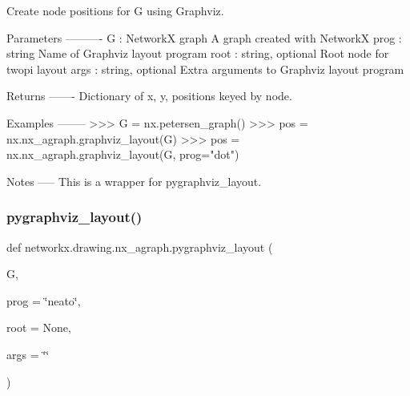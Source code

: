 \begin{DoxyVerb}Create node positions for G using Graphviz.

Parameters
----------
G : NetworkX graph
  A graph created with NetworkX
prog : string
  Name of Graphviz layout program
root : string, optional
  Root node for twopi layout
args : string, optional
  Extra arguments to Graphviz layout program

Returns
-------
  Dictionary of x, y, positions keyed by node.

Examples
--------
>>> G = nx.petersen_graph()
>>> pos = nx.nx_agraph.graphviz_layout(G)
>>> pos = nx.nx_agraph.graphviz_layout(G, prog="dot")

Notes
-----
This is a wrapper for pygraphviz_layout.
\end{DoxyVerb}
 \mbox{\label{namespacenetworkx_1_1drawing_1_1nx__agraph_a0fec68f59eb84649dcb77309028365bc}} 
\subsubsection{\texorpdfstring{pygraphviz\+\_\+layout()}{pygraphviz\_layout()}}
{\footnotesize\ttfamily def networkx.\+drawing.\+nx\+\_\+agraph.\+pygraphviz\+\_\+layout (\begin{DoxyParamCaption}\item[{}]{G,  }\item[{}]{prog = {\ttfamily \char`\"{}neato\char`\"{}},  }\item[{}]{root = {\ttfamily None},  }\item[{}]{args = {\ttfamily \char`\"{}\char`\"{}} }\end{DoxyParamCaption})}

